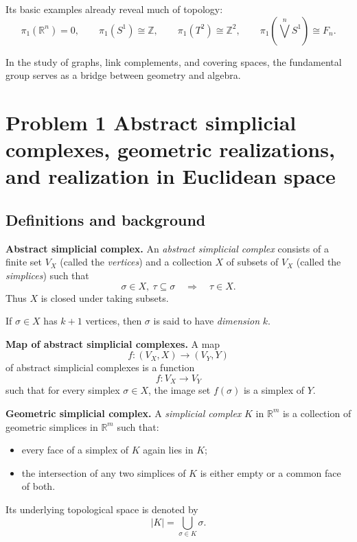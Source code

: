\documentclass[12pt,a4paper]{article}
\theoremstyle{notespace}
\begin{document}
Its basic examples already reveal much of topology:
\[
\pi_1(\mathbb R^n)=0,\qquad
\pi_1(S^1)\cong \mathbb Z,\qquad
\pi_1(T^2)\cong \mathbb Z^2,\qquad
\pi_1\!\left(\bigvee^n S^1\right)\cong F_n.
\]

In the study of graphs, link complements, and covering spaces, the fundamental group serves as a bridge between geometry and algebra.

\section{Problem 1 Abstract simplicial complexes, geometric realizations, and realization in Euclidean space}

\subsection{Definitions and background}

\textbf{Abstract simplicial complex.}
An \emph{abstract simplicial complex} consists of a finite set \(V_X\) (called the \emph{vertices}) and a collection \(X\) of subsets of \(V_X\) (called the \emph{simplices}) such that
\[
\sigma\in X,\ \tau\subseteq \sigma \quad \Longrightarrow \quad \tau\in X.
\]
Thus \(X\) is closed under taking subsets.

If \(\sigma\in X\) has \(k+1\) vertices, then \(\sigma\) is said to have \emph{dimension} \(k\).

\medskip

\textbf{Map of abstract simplicial complexes.}
A map
\[
f:(V_X,X)\to (V_Y,Y)
\]
of abstract simplicial complexes is a function
\[
f:V_X\to V_Y
\]
such that for every simplex \(\sigma\in X\), the image set \(f(\sigma)\) is a simplex of \(Y\).

\medskip

\textbf{Geometric simplicial complex.}
A \emph{simplicial complex} \(K\) in \(\mathbb R^m\) is a collection of geometric simplices in \(\mathbb R^m\) such that:
\begin{itemize}
	\item every face of a simplex of \(K\) again lies in \(K\);
	\item the intersection of any two simplices of \(K\) is either empty or a common face of both.
\end{itemize}

Its underlying topological space is denoted by
\[
|K|=\bigcup_{\sigma\in K}\sigma.
\]

\medskip
\end{document}

